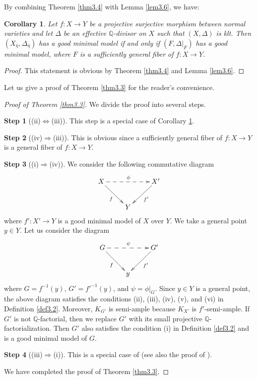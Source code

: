\documentclass[12pt,twoside]{amsart}
\newtheorem{cor}[thm]{Corollary}
\theoremstyle{definition}
\newtheorem{step}{Step}
\begin{document}
By combining Theorem \ref{thm3.4} with Lemma \ref{lem3.6}, 
we have: 

\begin{cor}\label{cor3.7}
Let $f:X\to Y$ be a projective surjective morphism 
between normal varieties and let $\Delta$ be 
an effective $\mathbb Q$-divisor on $X$ such that 
$(X, \Delta)$ is klt. 
Then $(X_{\overline \eta}, \Delta_{\overline \eta})$ has 
a good minimal model if and only if 
$(F, \Delta|_F)$ has a good minimal model, where 
$F$ is a sufficiently general fiber of $f:X\to Y$. 
\end{cor}

\begin{proof}
This statement is obvious by Theorem \ref{thm3.4} and 
Lemma \ref{lem3.6}. 
\end{proof}

Let us give a proof of Theorem \ref{thm3.3} 
for the reader's convenience. 

\begin{proof}[Proof of Theorem \ref{thm3.3}] 
We divide the proof into several steps. 

\begin{step}[(ii)$\Longleftrightarrow$(iii)]\label{Tstep1}
This step is a special case of Corollary \ref{cor3.7}. 
\end{step}
\begin{step}[(iv)$\Longrightarrow$(iii)]\label{Tstep2}
This is obvious since a sufficiently general fiber of $f:X\to Y$ is 
a general fiber of $f:X\to Y$. 
\end{step}
\begin{step}[(i)$\Longrightarrow$(iv)]\label{Tstep3}
We consider the following commutative diagram 
$$
\xymatrix{
X\ar[dr]_{f}\ar@{-->}[rr]^\phi&& X'\ar[dl]^{f'}\\
&Y&
}
$$
where $f': X'\to Y$ is a good minimal model of $X$ over $Y$. 
We take a general point $y\in Y$. 
Let us 
consider the diagram 
$$
\xymatrix{
G\ar[dr]_{f}\ar@{-->}[rr]^\psi&& G'\ar[dl]^{f'}\\
&y&
}
$$ 
where $G=f^{-1}(y)$, $G'=f'^{-1}(y)$, and $\psi=\phi|_G$. 
Since $y\in Y$ is a general point, the 
above diagram satisfies the conditions (ii), (iii), 
(iv), (v), and (vi) in Definition \ref{def3.2}. 
Moreover, $K_{G'}$ is semi-ample because $K_{X'}$ is $f'$-semi-ample. 
If $G'$ is not $\mathbb Q$-factorial, 
then we replace $G'$ with its small projective 
$\mathbb Q$-factorialization. 
Then $G'$ also satisfies the condition (i) in Definition \ref{def3.2} and 
is a good minimal model of $G$. 
\end{step}
\begin{step}[(iii)$\Longrightarrow$(i)]\label{Tstep4}
This is a special case of \cite[Theorem 2.12]{hacon-xu} 
(see also the proof of \cite[Theorem 5.1]{birkar}). 
\end{step}
We have completed the proof of Theorem \ref{thm3.3}. 
\end{proof}
\end{document}
